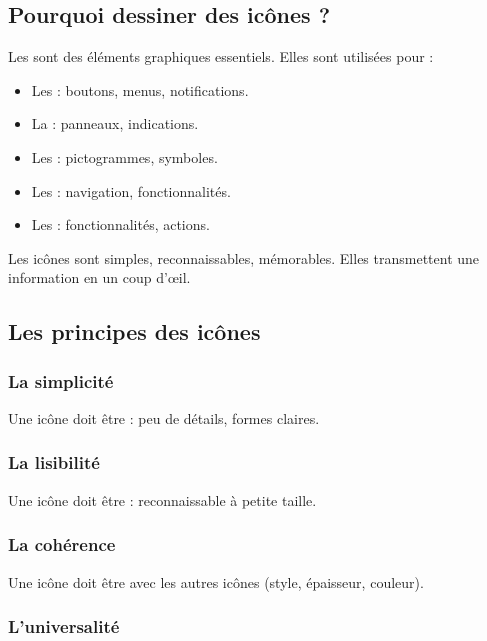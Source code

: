 \subsection{Pourquoi dessiner des icônes ?}

Les  sont des éléments graphiques essentiels. Elles sont utilisées pour :

\begin{itemize}
    \item Les  : boutons, menus, notifications.
    \item La  : panneaux, indications.
    \item Les  : pictogrammes, symboles.
    \item Les  : navigation, fonctionnalités.
    \item Les  : fonctionnalités, actions.
\end{itemize}

Les icônes sont simples, reconnaissables, mémorables. Elles transmettent une information en un coup d'œil.

\subsection{Les principes des icônes}

\subsubsection{La simplicité}

Une icône doit être  : peu de détails, formes claires.

\subsubsection{La lisibilité}

Une icône doit être  : reconnaissable à petite taille.

\subsubsection{La cohérence}

Une icône doit être  avec les autres icônes (style, épaisseur, couleur).

\subsubsection{L'universalité}

